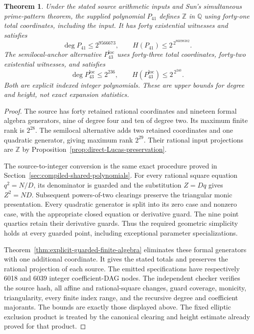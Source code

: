 \documentclass[11pt]{article}
\newtheorem{theorem}{Theorem}[section]
\theoremstyle{definition}
\begin{document}
\begin{theorem}\label{thm:p3-polynomial41}
Under the stated source arithmetic inputs and Sun's simultaneous
prime-pattern theorem, the supplied polynomial $P_{41}$ defines
$\mathbb Z$ in $\mathbb Q$ using forty-one total coordinates,
including the input. It has forty existential witnesses and satisfies
\[
        \deg P_{41}\le 2^{9566673},
        \qquad H(P_{41})\le 2^{\,2^{86098382}}.
\]
The semilocal-anchor alternative $P_{43}^{\mathrm{loc}}$ uses
forty-three total coordinates, forty-two existential witnesses, and
satisfies
\[
        \deg P_{43}^{\mathrm{loc}}\le 2^{236},
        \qquad H(P_{43}^{\mathrm{loc}})\le 2^{\,2^{240}}.
\]
Both are explicit indexed integer polynomials. These are upper bounds
for degree and height, not exact expansion statistics.
\end{theorem}
\begin{proof}
The source has forty retained rational coordinates and nineteen
formal algebra generators, nine of degree four and ten of degree
two. Its maximum finite rank is $2^{28}$. The semilocal alternative
adds two retained coordinates and one quadratic generator, giving
maximum rank $2^{29}$. Their rational input projections are
$\mathbb Z$ by Proposition~\ref{prop:direct-Lucas-preservation}.

The source-to-integer conversion is the same exact procedure proved
in Section~\ref{sec:compiled-shared-polynomials}. For every rational
square equation $q^2=N/D$, its denominator is guarded and the
substitution $Z=Dq$ gives $Z^2=ND$. Subsequent powers-of-two
clearings preserve the triangular monic presentation. Every
quadratic generator is split into its zero case and nonzero case,
with the appropriate closed equation or derivative guard. The nine
point quartics retain their derivative guards. Thus the required
geometric simplicity holds at every guarded point, including
exceptional parameter specializations.

Theorem~\ref{thm:explicit-guarded-finite-algebra} eliminates these
formal generators with one additional coordinate. It gives the
stated totals and preserves the rational projection of each source.
The emitted specifications have respectively 6018 and 6039 integer
coefficient-DAG nodes. The independent checker verifies the source
hash, all affine and rational-square changes, guard coverage, monicity,
triangularity, every finite index range, and the recursive degree and
coefficient majorants. The bounds are exactly those displayed above.
The fixed elliptic exclusion product is treated by the canonical
clearing and height estimate already proved for that product.
\end{proof}
\end{document}
